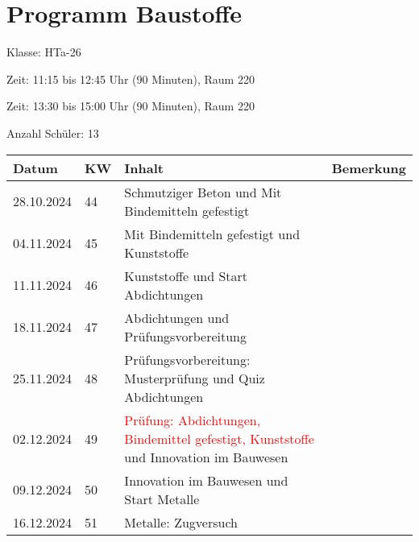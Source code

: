 \documentclass[
11pt,
captions=tableheading,
headings=big,
headsepline,
footsepline, 
captions=tableheading,
parskip=half-,
]{scrartcl}
\title{\fach}
\date{2024}
\newcommand{\klasse}{HTa-26\xspace}
\newcommand{\red}[1]{\textcolor{red}{#1}}
\begin{document}
\section*{Programm Baustoffe}

Klasse: \klasse

Zeit: 11:15 bis 12:45 Uhr (90 Minuten), Raum 220

Zeit: 13:30 bis 15:00 Uhr (90 Minuten), Raum 220

Anzahl Schüler: 13

\vspace{1cm}



\begin{table}[H]
    \centering
    \begin{tabular}{llp{8.5cm}p{3.5cm}}
        \toprule
        \textbf{Datum} & \textbf{KW} & \textbf{Inhalt}                                                                            & \textbf{Bemerkung}                \\
        \midrule
        28.10.2024     & 44          & Schmutziger Beton und Mit Bindemitteln gefestigt                                           & {}                                \\
        04.11.2024     & 45          & Mit Bindemitteln gefestigt und Kunststoffe                                                 & {}                                \\
        11.11.2024     & 46          & Kunststoffe  und Start Abdichtungen                                                        & {}                                \\
        18.11.2024     & 47          & Abdichtungen und Prüfungsvorbereitung                                                      & {}                                \\
        25.11.2024     & 48          & Prüfungsvorbereitung: Musterprüfung und Quiz Abdichtungen                                  & {}                                \\
        02.12.2024     & 49          & \red{Prüfung: Abdichtungen, Bindemittel gefestigt, Kunststoffe} und Innovation im Bauwesen & {}                                \\
        09.12.2024     & 50          & Innovation im Bauwesen und Start Metalle                                                   & {}                                \\
        16.12.2024     & 51          & Metalle: Zugversuch                                                                        & {}                                \\

\end{tabular}
\end{table}
\end{document}
